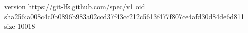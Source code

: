 version https://git-lfs.github.com/spec/v1
oid sha256:a008c4c0b0896b983a02ccd37f43cc212c5613f477f807ce4afd30d84de6d811
size 10018
